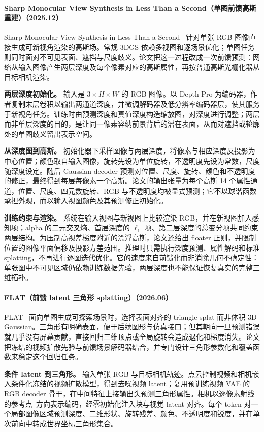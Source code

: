 \paragraph{Sharp Monocular View Synthesis in Less Than a Second（单图前馈高斯重建）（2025.12）}
Sharp Monocular View Synthesis in Less Than a Second~\cite{2512_10685} 针对单张 RGB 图像直接生成可新视角渲染的高斯场。常规 3DGS 依赖多视图和逐场景优化；单图任务则同时面对不可见表面、遮挡与尺度歧义。论文把这一过程改成一次前馈预测：网络从输入图像产生两层深度及每个像素对应的高斯属性，再按普通高斯光栅化器从目标相机渲染。

\textbf{两层深度初始化。} 输入是 $3\times H\times W$ 的 RGB 图像。以 Depth Pro 为编码器，作者复制末层卷积以输出两通道深度，并微调解码器及低分辨率编码器层，使其服务于新视角任务。训练时由预测深度和真值深度构造缩放图，对深度进行调整；两层而非单层深度的目的，是让同一像素容纳前景背后的潜在表面，从而对遮挡或轮廓处的单图歧义留出表示空间。

\textbf{从深度图到高斯。} 初始化器下采样图像与两层深度，将像素与相应深度反投影为中心位置；颜色取自输入图像，旋转先设为单位旋转，不透明度先设为常数，尺度随深度设定。随后 Gaussian decoder 预测对位置、尺度、旋转、颜色和不透明度的修正，最终得到每层每像素一个高斯。论文的输出张量为每个高斯 14 个属性通道，位置、尺度、四元数旋转、RGB 与不透明度均被显式预测；它不以球谐函数承担外观，而以输入视图颜色及其预测修正初始化。

\textbf{训练约束与渲染。} 系统在输入视图与新视图上比较渲染 RGB，并在新视图加入感知项；alpha 的二元交叉熵、首层深度的 $\ell_1$ 项、第二层深度的总变分项共同约束两层结构。为压制高视差梯度附近的漂浮高斯，论文还给出 floater 正则，并限制位置的图像平面偏移及投影方差范围。推理时只需执行深度预测、属性解码和标准 splatting，不再进行逐图迭代优化。它的速度来自前馈化而非消除几何不确定性：单张图中不可见区域仍依赖训练数据先验，两层深度也不能保证恢复真实的完整三维拓扑。

\paragraph{FLAT（前馈 latent 三角形 splatting）（2026.06）}
FLAT~\cite{2606_24876} 面向单图生成可探索场景时，选择表面对齐的 triangle splat 而非体积 3D Gaussian。三角形有明确表面，便于后续图形与仿真接口；但其朝向一旦预测错误就几乎没有屏幕贡献，直接回归三维顶点或全局旋转会造成退化和梯度消失。论文把冻结的视频扩散先验与前馈场景解码器结合，并专门设计三角形参数化和覆盖函数来稳定这个回归任务。

\textbf{条件 latent 到三角形。} 输入单张 RGB 与目标相机轨迹。点云控制视频和相机嵌入条件化冻结的视频扩散模型，得到去噪视频 latent；复用预训练视频 VAE 的 RGB decoder 骨干，在中间特征上接输出头预测三角形属性。相机以逐像素射线的参考点--方向表示编码，经零初始化注入块与视觉 latent 对齐。每个 token 对一个局部图像区域预测深度、二维形状、旋转残差、颜色、不透明度和锐度，并在单次前向中转成世界坐标三角形集合。

